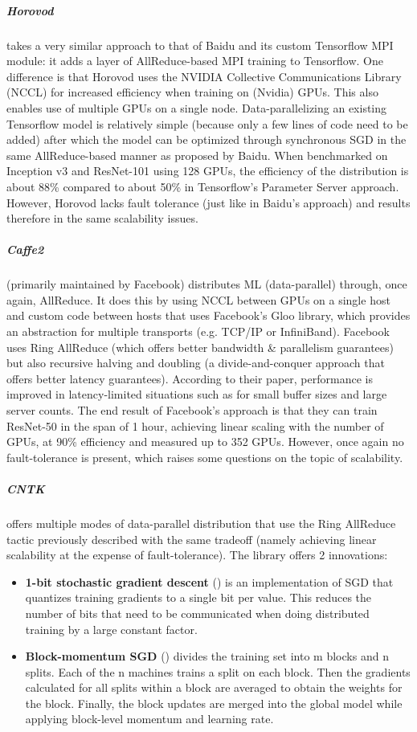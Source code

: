 \subparagraph{Horovod\citep{Horovod2018}}
takes a very similar approach to that of Baidu and its custom Tensorflow MPI module: it adds a layer of AllReduce-based MPI training to Tensorflow. One difference is that Horovod uses the NVIDIA Collective Communications Library (NCCL) for increased efficiency when training on (Nvidia) GPUs. This also enables use of multiple GPUs on a single node. Data-parallelizing an existing Tensorflow model is relatively simple (because only a few lines of code need to be added) after which the model can be optimized through synchronous SGD in the same AllReduce-based manner as proposed by Baidu. When benchmarked on Inception v3\citep{Szegedy2015} and ResNet-101\citep{He2015} using 128 GPUs, the efficiency of the distribution is about 88\% compared to about 50\% in Tensorflow's Parameter Server approach.\\
However, Horovod lacks fault tolerance (just like in Baidu's approach) and results therefore in the same scalability issues.

\subparagraph{Caffe2}
(primarily maintained by Facebook) distributes ML (data-parallel) through, once again, AllReduce. It does this by using NCCL between GPUs on a single host and custom code between hosts that uses Facebook's Gloo library, which provides an abstraction for multiple transports (e.g. TCP/IP or InfiniBand). Facebook uses Ring AllReduce (which offers better bandwidth \& parallelism guarantees) but also recursive halving and doubling (a divide-and-conquer approach that offers better latency guarantees). According to their paper, performance is improved in latency-limited situations such as for small buffer sizes and large server counts. The end result of Facebook’s approach is that they can train ResNet-50\citep{He2015} in the span of 1 hour\citep{Goyal2017}, achieving linear scaling with the number of GPUs, at 90\% efficiency and measured up to 352 GPUs. However, once again no fault-tolerance is present, which raises some questions on the topic of scalability.

\subparagraph{CNTK}
offers multiple modes of data-parallel distribution that use the Ring AllReduce tactic previously described with the same tradeoff (namely achieving linear scalability at the expense of fault-tolerance). The library offers 2 innovations:
\begin{itemize}
	\item \textbf{1-bit stochastic gradient descent} (\citet{Seide2014}) is an implementation of SGD that quantizes training gradients to a single bit per value. This reduces the number of bits that need to be communicated when doing distributed training by a large constant factor.
	\item \textbf{Block-momentum SGD} (\citet{Chen2016}) divides the training set into m blocks and n splits. Each of the n machines trains a split on each block. Then the gradients calculated for all splits within a block are averaged to obtain the weights for the block. Finally, the block updates are merged into the global model while applying block-level momentum and learning rate.
\end{itemize}

